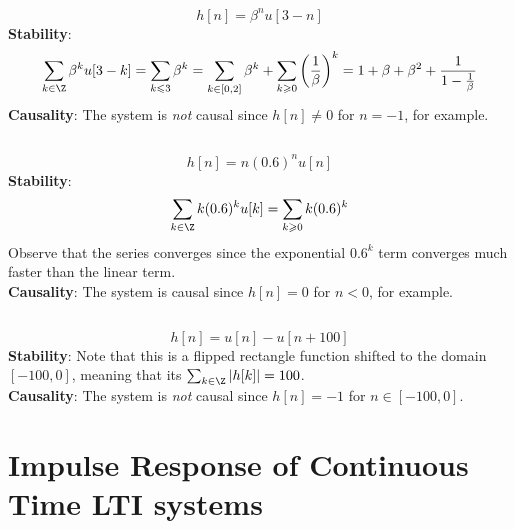 \documentclass{article}
\begin{document}
\begin{equation}
    h[n] = \beta^n u[3 - n]
\end{equation}
\textbf{Stability}:
\begin{equation}
    \sum_{k \in \Z} \beta^k u[3 - k] = \sum_{k \leqslant 3} \beta^k = \sum_{k \in [0, 2]} \beta^k + \sum_{k \geqslant 0} \left(\frac{1}{\beta}\right)^k = 1 + \beta + \beta^2 + \frac{1}{1 - \frac{1}{\beta}}
\end{equation}
\textbf{Causality}: The system is \emph{not} causal since \(h[n] \neq 0\) for \(n = -1\), for example.

\subsection{}

\begin{equation}
    h[n] = n (0.6)^n u[n]
\end{equation}
\textbf{Stability}:
\begin{equation}
    \sum_{k \in \Z} k (0.6)^k u[k] = \sum_{k \geqslant 0} k (0.6)^k
\end{equation}
Observe that the series converges since the exponential \(0.6^k\) term converges much faster than the linear term. \\ %
\textbf{Causality}: The system is causal since \(h[n] = 0\) for \(n < 0\), for example.

\subsection{}

\begin{equation}
    h[n] = u[n] - u[n + 100]
\end{equation}
\textbf{Stability}: Note that this is a flipped rectangle function shifted to the domain \([-100, 0]\), meaning that its \(\sum_{k \in \Z} |h[k]| = 100\). \\
\textbf{Causality}: The system is \emph{not} causal since \(h[n] = -1\) for \(n \in [-100, 0]\).

\section{Impulse Response of Continuous Time LTI systems}

\subsection{}
\end{document}
